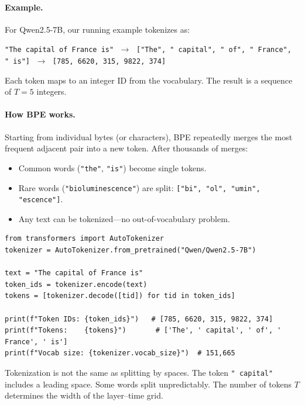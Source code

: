 \documentclass[11pt, twoside, openright]{memoir}
\begin{document}
\paragraph{Example.} For Qwen2.5-7B, our running example tokenizes as:

\begin{center}\small
\texttt{"The capital of France is"} $\;\to\;$
\texttt{["The", " capital", " of", " France", " is"]}
$\;\to\;$ \texttt{[785, 6620, 315, 9822, 374]}
\end{center}

Each token maps to an integer ID from the vocabulary.  The result is a
sequence of $T = 5$ integers.

\paragraph{How BPE works.} Starting from individual bytes (or characters),
BPE repeatedly merges the most frequent adjacent pair into a new token.
After thousands of merges:
\begin{itemize}[nosep]
\item Common words (\texttt{"the"}, \texttt{"is"}) become single tokens.
\item Rare words (\texttt{"bioluminescence"}) are split:
  \texttt{["bi", "ol", "umin", "escence"]}.
\item Any text can be tokenized---no out-of-vocabulary problem.
\end{itemize}

\begin{lstlisting}[caption={Tokenization in Python}]
from transformers import AutoTokenizer
tokenizer = AutoTokenizer.from_pretrained("Qwen/Qwen2.5-7B")

text = "The capital of France is"
token_ids = tokenizer.encode(text)
tokens = [tokenizer.decode([tid]) for tid in token_ids]

print(f"Token IDs: {token_ids}")   # [785, 6620, 315, 9822, 374]
print(f"Tokens:    {tokens}")       # ['The', ' capital', ' of', ' France', ' is']
print(f"Vocab size: {tokenizer.vocab_size}")  # 151,665
\end{lstlisting}

\begin{pitfall}
Tokenization is not the same as splitting by spaces.  The token
\texttt{" capital"} includes a leading space.  Some words split
unpredictably.  The number of tokens $T$ determines the width of the
layer--time grid.
\end{pitfall}
\end{document}
